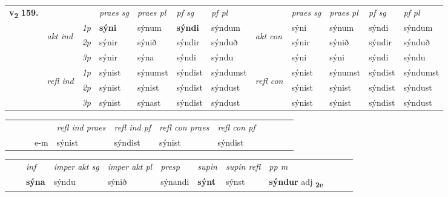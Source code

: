 \begin{tabular}{llllllllllll} \toprule
\multirow{4}{*}{{{\textbf{v{\textsubscript{2}}} \Large{\textbf{159.}}}}}  & &   &  \textit{praes sg}  & \textit{praes pl}  &\textit{ pf sg} & \textit{pf pl} &  &  \textit{praes sg}  & \textit{praes pl}  & \textit{pf sg} & \textit{pf pl } \\*
	\cmidrule{4-7} \cmidrule{9-12}
 & \multirow{3}{*}{\begin{turn}{90}\textit{akt ind}\end{turn}} & {\textit{1p}} & \textbf{sýni} & sýnum    & \textbf{sýndi} & sýndum & \multirow{3}{*}{\begin{turn}{90}\textit{akt con}\end{turn}} &sýni & sýnum & sýndi & sýndum\\*
& &  {\textit{2p}} &  sýnir  & sýnið   & sýndir & sýnduð & & sýnir & sýnið & sýndir & sýnduð \\*
& &  {\textit{3p}} & sýnir & sýna   & sýndi & sýndu & & sýni & sýni& sýndi & sýndu  \\*
\cmidrule{4-7} \cmidrule{9-12}
 &\multirow{3}{*}{\begin{turn}{90}\textit{refl ind}\end{turn}} & {\textit{1p}} & sýnist & sýnumst    & sýndist & sýndumst & \multirow{3}{*}{\begin{turn}{90}\textit{refl con}\end{turn}}  &sýnist & sýnumst & sýndist & sýndumst\\*
 &&  {\textit{2p}} &  sýnist  & sýnist   & sýndist & sýndust & &sýnist & sýnist & sýndist & sýndust \\*
& &  {\textit{3p}} & sýnist & sýnast   & sýndist & sýndust & & sýnist & sýnist& sýndist & sýndust  \\*
\cmidrule{4-7} \cmidrule{9-12}
\end{tabular}


\begin{tabular}{llllllllllll}
 & &  & &  \textit{refl ind praes} & \textit{refl ind pf} & \textit{refl con praes} & \textit{refl con pf} \\*
&  & & e-m & sýnist & sýndist & sýnist & sýndist \\*
\cmidrule{5-9}
\end{tabular}


\begin{tabular}{llllllllllll}
 & & \textit{inf} & \textit{imper akt sg} & \textit{imper akt pl}   & \textit{presp} & \textit{supin} & \textit{supin refl} & \textit{pp m}     \\*
  & & \textbf{sýna} & sýndu  & sýnið   & sýnandi &  \textbf{sýnt} & sýnst & \textbf{sýndur} adj \textbf{\textsubscript{2e}} \\*
\cmidrule{1-12}
\end{tabular}



